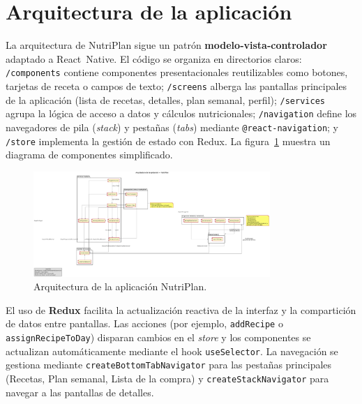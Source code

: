 \documentclass[twoside, openright, 11pt]{report}
\begin{document}
\section{Arquitectura de la aplicación}
La arquitectura de NutriPlan sigue un patrón \textbf{modelo‑vista‑controlador} adaptado a React Native. El código se organiza en directorios claros: \verb|/components| contiene componentes presentacionales reutilizables como botones, tarjetas de receta o campos de texto; \verb|/screens| alberga las pantallas principales de la aplicación (lista de recetas, detalles, plan semanal, perfil); \verb|/services| agrupa la lógica de acceso a datos y cálculos nutricionales; \verb|/navigation| define los navegadores de pila (\textit{stack}) y pestañas (\textit{tabs}) mediante \verb|@react-navigation|; y \verb|/store| implementa la gestión de estado con Redux. La figura~\ref{fig:arquitectura} muestra un diagrama de componentes simplificado.

\begin{figure}[h]
  \centering
  \includegraphics[width=0.8\textwidth]{imagenes/arquitectura.png}
  \caption{Arquitectura de la aplicación NutriPlan.}
  \label{fig:arquitectura}
\end{figure}

El uso de \textbf{Redux} facilita la actualización reactiva de la interfaz y la compartición de datos entre pantallas. Las acciones (por ejemplo, \texttt{addRecipe} o \texttt{assignRecipeToDay}) disparan cambios en el \emph{store} y los componentes se actualizan automáticamente mediante el hook \verb|useSelector|. La navegación se gestiona mediante \verb|createBottomTabNavigator| para las pestañas principales (Recetas, Plan semanal, Lista de la compra) y \verb|createStackNavigator| para navegar a las pantallas de detalles.
\end{document}
